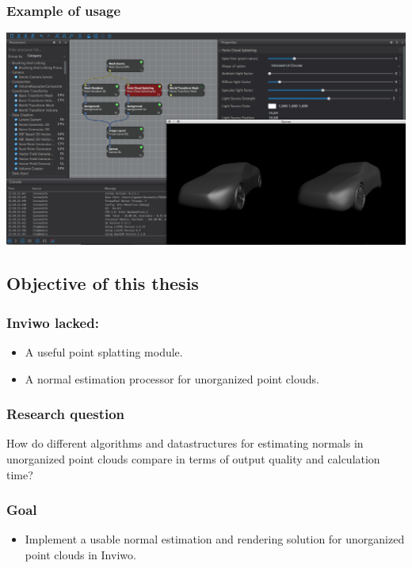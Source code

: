 \documentclass[11pt]{article}
\begin{document}
\subsubsection*{Example of usage}
\label{sec:org6c522d9}
\begin{center}
\includegraphics[width=.9\linewidth]{./images/ui.png}
\end{center}

\subsection*{Objective of this thesis}
\label{sec:orgac66f97}
\subsubsection*{Inviwo lacked:}
\label{sec:orgec9158e}
\begin{itemize}
\item A useful point splatting module.
\item A normal estimation processor for unorganized point clouds.
\end{itemize}

\subsubsection*{Research question}
\label{sec:org4673fc6}
How do different algorithms and datastructures for estimating normals in unorganized point clouds compare in terms of output quality and calculation time?

\subsubsection*{Goal}
\label{sec:org5673856}
\begin{itemize}
\item Implement a usable normal estimation and rendering solution for unorganized point clouds in Inviwo.
\end{itemize}
\end{document}
